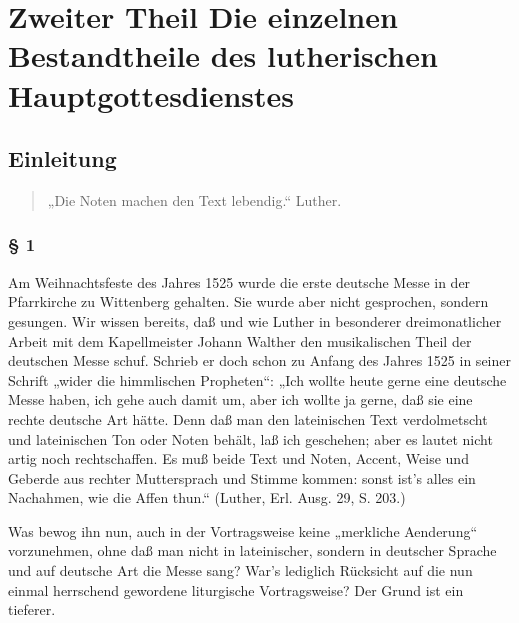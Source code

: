 \part[Zweiter Theil]{Zweiter Theil Die einzelnen Bestandtheile des lutherischen Hauptgottesdienstes}
\chapter{Einleitung}


\begin{quote}
„Die Noten machen den Text lebendig.“ Luther.
\end{quote}

\section{§ 1}


Am Weihnachtsfeste des Jahres 1525 wurde die erste deutsche Messe in der Pfarrkirche zu Wittenberg gehalten. Sie wurde aber nicht gesprochen, sondern gesungen. Wir wissen bereits, daß und wie Luther in besonderer dreimonatlicher Arbeit mit dem Kapellmeister Johann Walther den musikalischen Theil der deutschen Messe schuf. Schrieb er doch schon zu Anfang des Jahres 1525 in seiner Schrift „wider die himmlischen Propheten“: „Ich wollte heute gerne eine deutsche Messe haben, ich gehe auch damit um, aber ich wollte ja gerne, daß sie eine rechte deutsche Art hätte. Denn daß man den lateinischen Text verdolmetscht und lateinischen Ton oder Noten behält, laß ich geschehen; aber es lautet nicht artig noch rechtschaffen. Es muß beide Text und Noten, Accent, Weise und Geberde aus rechter Muttersprach und Stimme kommen: sonst ist’s alles ein Nachahmen, wie die Affen thun.“ (Luther, Erl. Ausg. 29, S. 203.)

Was bewog ihn nun, auch in der Vortragsweise keine „merkliche Aenderung“ vorzunehmen, ohne daß man nicht in lateinischer, sondern in deutscher Sprache und auf deutsche Art die Messe sang? War’s lediglich Rücksicht auf die nun einmal herrschend gewordene liturgische Vortragsweise? Der Grund ist ein tieferer.

